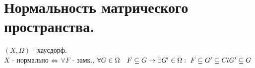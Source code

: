 \documentclass[geometry.tex]{subfiles}
\begin{document}
  \section{Нормальность матрического пространства.}

  \begin{definition}
      $(X, \Omega)$ - хаусдорф.\\
      $X$ - нормально $\Leftrightarrow$ $\forall F$ - замк., $\forall G \in \Omega \quad F \subseteq G \rightarrow
      \exists G' \in \Omega:\\ \ F \subseteq G' \subseteq Cl G' \subseteq G$
  \end{definition}
\end{document}

